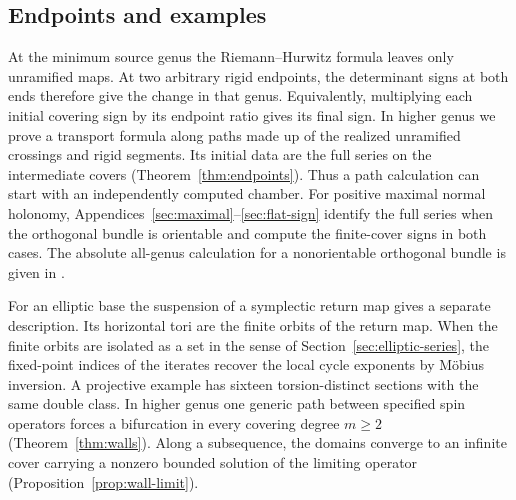 \subsection*{Endpoints and examples}
At the minimum source genus the Riemann--Hurwitz formula leaves only
unramified maps. At two arbitrary rigid endpoints, the determinant signs at both ends
therefore give the change in that genus. Equivalently, multiplying
each initial covering sign by its endpoint ratio gives its final sign. In higher genus we prove a transport formula along
paths made up of the realized unramified crossings and rigid segments.
Its initial data are the full series on the intermediate covers
(Theorem~\ref{thm:endpoints}). Thus a path calculation can start
with an independently computed chamber. For positive maximal normal holonomy, Appendices~\ref{sec:maximal}--\ref{sec:flat-sign}
identify the full series when the orthogonal bundle is orientable and
compute the finite-cover signs in both cases. The absolute all-genus
calculation for a nonorientable orthogonal bundle is given in
\cite[Theorem~1.1]{WueSpin}.

For an elliptic base the suspension of a symplectic return map gives
a separate description. Its horizontal tori are the finite orbits of
the return map. When the finite orbits are isolated as a set in the
sense of Section~\ref{sec:elliptic-series}, the fixed-point indices
of the iterates recover the local cycle exponents by M\"obius inversion.
A projective example has sixteen torsion-distinct sections with the
same double class. In higher genus one generic path between specified
spin operators forces a bifurcation in every covering degree $m\ge2$
(Theorem~\ref{thm:walls}). Along a subsequence, the domains converge
to an infinite cover carrying a nonzero bounded solution of the
limiting operator (Proposition~\ref{prop:wall-limit}).
